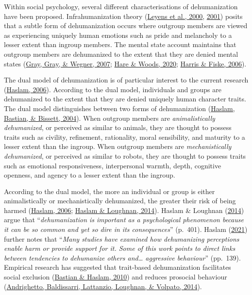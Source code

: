 \documentclass[
]{article}
\begin{document}
Within social psychology, several different characterisations of dehumanization have been proposed. Infrahumanization theory (\protect\hyperlink{ref-Leyens2000}{Leyens et al., 2000}, \protect\hyperlink{ref-Leyens2001}{2001}) posits that a subtle form of dehumanization occurs where outgroup members are viewed as experiencing uniquely human emotions such as pride and melancholy to a lesser extent than ingroup members. The mental state account maintains that outgroup members are dehumanized to the extent that they are denied mental states (\protect\hyperlink{ref-Gray2007}{Gray, Gray, \& Wegner, 2007}; \protect\hyperlink{ref-Hare2020}{Hare \& Woods, 2020}; \protect\hyperlink{ref-Harris2006}{Harris \& Fiske, 2006}).

The dual model of dehumanization is of particular interest to the current research (\protect\hyperlink{ref-Haslam2006}{Haslam, 2006}). According to the dual model, individuals and groups are dehumanized to the extent that they are denied uniquely human character traits. The dual model distinguishes between two forms of dehumanization (\protect\hyperlink{ref-Haslam2004}{Haslam, Bastian, \& Bissett, 2004}). When outgroup members are \emph{animalistically dehumanized}, or perceived as similar to animals, they are thought to possess traits such as civility, refinement, rationality, moral sensibility, and maturity to a lesser extent than the ingroup. When outgroup members are \emph{mechanistically dehumanized}, or perceived as similar to robots, they are thought to possess traits such as emotional responsiveness, interpersonal warmth, depth, cognitive openness, and agency to a lesser extent than the ingroup.

According to the dual model, the more an individual or group is either animalistically or mechanistically dehumanized, the greater their risk of being harmed (\protect\hyperlink{ref-Haslam2006}{Haslam, 2006}; \protect\hyperlink{ref-Haslam2014}{Haslam \& Loughnan, 2014}). Haslam \& Loughnan (\protect\hyperlink{ref-Haslam2014}{2014}) argue that ``\emph{dehumanization is important as a psychological phenomenon because it can be so common and yet so dire in its consequences}'' (p.~401). Haslam (\protect\hyperlink{ref-Haslam2021}{2021}) further notes that ``\emph{Many studies have examined how dehumanizing perceptions enable harm or provide support for it. Some of this work points to direct links between tendencies to dehumanize others and\ldots{} aggressive behaviour}'' (pp.~139). Empirical research has suggested that trait-based dehumanization facilitates social exclusion (\protect\hyperlink{ref-Bastian2010}{Bastian \& Haslam, 2010}) and reduces prosocial behaviour (\protect\hyperlink{ref-Andrighetto2014}{Andrighetto, Baldissarri, Lattanzio, Loughnan, \& Volpato, 2014}).
\end{document}
